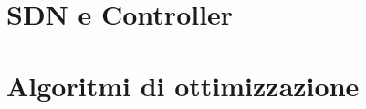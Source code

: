 \documentclass[letterpaper,10pt,english]{jupyterBook}
\begin{document}
\sphinxstepscope


\part{SDN e Controller}

\sphinxstepscope

\sphinxstepscope


\part{Algoritmi di ottimizzazione}

\sphinxstepscope


\chapter{}
\label{\detokenize{chapters/optmization:id1}}\label{\detokenize{chapters/optmization::doc}}






\renewcommand{\indexname}{Index}
\printindex
\end{document}
